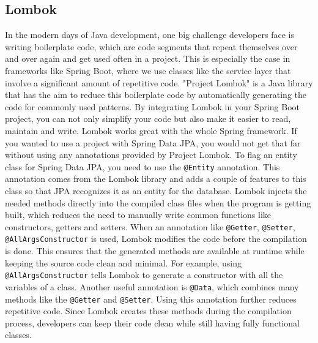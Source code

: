     \subsection{Lombok}
    In the modern days of Java development, one big challenge developers face is writing boilerplate code, which are code segments that repeat themselves over and over again and get used often in a project. This is especially the case in frameworks like Spring Boot, where we use classes like the service layer that involve a significant amount of repetitive code.  \newline
    "Project Lombok" is a Java library that has the aim to reduce this boilerplate code by automatically generating the code for commonly used patterns. By integrating Lombok in your Spring Boot project, you can not only simplify your code but also make it easier to read, maintain and write. 
    Lombok works great with the whole Spring framework. If you wanted to use a project with Spring Data JPA, you would not get that far without using any annotations provided by Project Lombok. To flag an entity class for Spring Data JPA, you need to use the \texttt{@Entity} annotation. This annotation comes from the Lombok library and adds a couple of 
    features to this class so that JPA recognizes it as an entity for the database. \newline
    Lombok injects the needed methods directly into the compiled class files when the program is getting built, which reduces the need to manually write common functions like constructors, getters and setters. When an annotation like \texttt{@Getter}, \texttt{@Setter}, \texttt{@AllArgsConstructor} is used, Lombok modifies the code before the compilation is done. This ensures that the generated methods are available at runtime while keeping the source code clean and minimal. \newline
    For example, using \texttt{@AllArgsConstructor} tells Lombok to generate a constructor with all the variables of a class. Another useful annotation is \texttt{@Data}, which combines many methods like the \texttt{@Getter} and \texttt{@Setter}. Using this annotation further reduces repetitive code. \newline
    Since Lombok creates these methods during the compilation process, developers can keep their code clean while still having fully functional classes. \Autocite{Andi:Lombok1, Andi:Lombok2, Andi:Lombok3}
    
